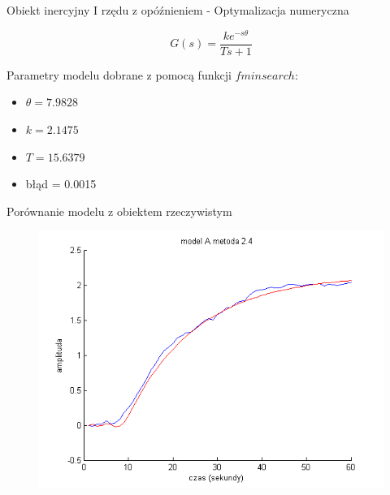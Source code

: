 \documentclass{beamer}
\begin{document}
\begin{frame}{Obiekt inercyjny I rzędu z opóźnieniem - Optymalizacja numeryczna }

\begin{equation*}
G(s) = \frac{k e^{-s \theta}}{T s + 1}
\end{equation*}

Parametry modelu dobrane z pomocą funkcji $fminsearch$:

\begin{itemize}
\item $\theta =  7.9828$
\item $k = 2.1475$
\item $T = 15.6379 $
\item błąd = 0.0015
\end{itemize}

\end{frame}


\begin{frame}{Porównanie modelu z obiektem rzeczywistym}

\begin{figure}
\includegraphics[width = \linewidth]{A_2_4}
\end{figure}

\end{frame}

\end{document}
